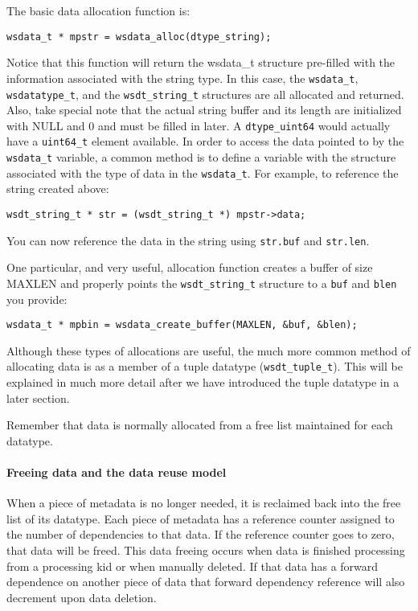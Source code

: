 \documentclass[11pt]{article}
\begin{document}
The basic data allocation function is:
\begin{lstlisting}
wsdata_t * mpstr = wsdata_alloc(dtype_string);
\end{lstlisting}
 
Notice that this function will return the wsdata\_t structure pre-filled 
with the information associated with the string type.  In this case, the
\texttt{wsdata\_t}, \texttt{wsdatatype\_t}, and the \texttt{wsdt\_string\_t} 
structures are all allocated and returned. Also, take special note that the 
actual string buffer and its length are initialized with NULL and 0 and must be
filled in later.  A \texttt{dtype\_uint64} would actually have a 
\texttt{uint64\_t} element available.  In order to access the data pointed to 
by the \texttt{wsdata\_t} variable, a common method is to define a variable 
with the structure associated with the type of data in the \texttt{wsdata\_t}.
For example, to reference the string created above:
\begin{lstlisting}
wsdt_string_t * str = (wsdt_string_t *) mpstr->data;
\end{lstlisting}

You can now reference the data in the string using \texttt{str.buf} 
and \texttt{str.len}.
 
One particular, and very useful, allocation function creates a buffer of 
size MAXLEN and properly points the \texttt{wsdt\_string\_t} structure to a 
\texttt{buf} and  \texttt{blen} you provide:
\begin{lstlisting}
wsdata_t * mpbin = wsdata_create_buffer(MAXLEN, &buf, &blen);
\end{lstlisting}
 
Although these types of allocations are useful, the much more common method of
allocating data is as a member of a tuple datatype (\texttt{wsdt\_tuple\_t}).  
This will be explained in much more detail after we have introduced the 
tuple datatype in a later section.
 
Remember that data is normally allocated from a free list maintained for each
datatype.

\paragraph{Freeing data and the data reuse model\newline\newline}

When a piece of metadata is no longer needed, it is reclaimed back into the
free list of its datatype. Each piece of metadata has a reference counter
assigned to the number of dependencies to that data. If the reference counter
goes to zero, that data will be freed. This data freeing occurs when data is
finished processing from a processing kid or when manually deleted. If that
data has a forward dependence on another piece of data that forward dependency
reference will also decrement upon data deletion.
\end{document}
